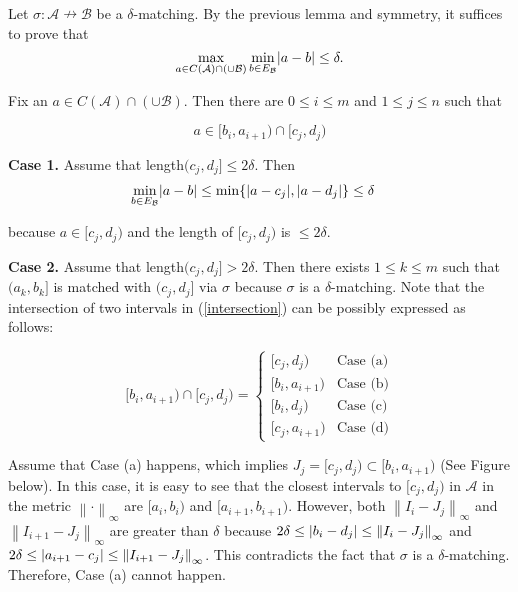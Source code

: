 \documentclass[a4paper,12pt]{article}
\DeclarePairedDelimiter{\abs}{\lvert}{\rvert}
\newcommand{\norm}[1]{\left\lVert#1\right\rVert}
\begin{document}
Let $\sigma:\mathcal{A} \nrightarrow \mathcal{B}$
be a $\delta$-matching. By the previous lemma and symmetry, it suffices to prove that $$\max_{a\in C(\mathcal{A})\cap (\cup \mathcal{B})}\min_{b\in E_\mathcal{B}} \abs{a-b}\leq \delta.$$

Fix an $a\in C(\mathcal{A})\cap (\cup \mathcal{B})$. Then there are $0\leq i\leq m$ and $1\leq j \leq n$ such that 

\begin{equation}\label{intersection}
a\in [b_i, a_{i+1})\cap [c_j,d_j) 
\end{equation}

\textbf{Case 1.} Assume that length$(c_j,d_j]\leq 2\delta$. Then 
\begin{align*}
\min_{b\in E_{\mathcal{B}}}\abs{a-b}&\leq \min \{\abs{a-c_j}, \abs{a-d_j}\}\leq \delta 
\end{align*}

because $a\in [c_j, d_j)$ and the length of $[c_j,d_j)$ is $\leq 2\delta$.

\vspace{3mm}

\textbf{Case 2.} Assume that length$(c_j,d_j]>2\delta$. Then there exists $1\leq k\leq m$ such that $(a_k, b_k]$ is matched with $(c_j,d_j]$ via $\sigma$ because $\sigma$ is a $\delta$-matching. Note that the intersection of two intervals in (\ref{intersection}) can be possibly expressed as follows:

$$[b_i, a_{i+1})\cap [c_j,d_j)=\begin{cases} [c_j,d_j)& \mbox{Case (a)} \\ [b_i, a_{i+1})& \mbox{Case (b)}\\ [b_i, d_j)& \mbox{Case (c)} \\ [c_j, a_{i+1})& \mbox{Case (d)} \end{cases} $$

Assume that Case (a) happens, which implies $J_j=[c_j,d_j)\subset [b_i,a_{i+1})$ (See Figure below). In this case, it is easy to see that the closest intervals to $[c_j, d_j)$ in $\mathcal{A}$ in the metric  $\norm{\cdot}_\infty$ are $[a_i, b_i)$ and $[a_{i+1}, b_{i+1})$. However, both $\norm{I_i-J_j}_\infty$ and $\norm{I_{i+1}- J_j}_\infty$ are greater than $\delta$ because $2\delta \leq \abs{b_i-d_j} \leq \norm{I_i-J_j}_\infty$ and $2\delta \leq \abs{a_{i+1}-c_j} \leq \norm{I_{i+1}- J_j}_\infty$. This contradicts the fact that $\sigma$ is a $\delta$-matching. Therefore, Case (a) cannot happen. \par
\end{document}
